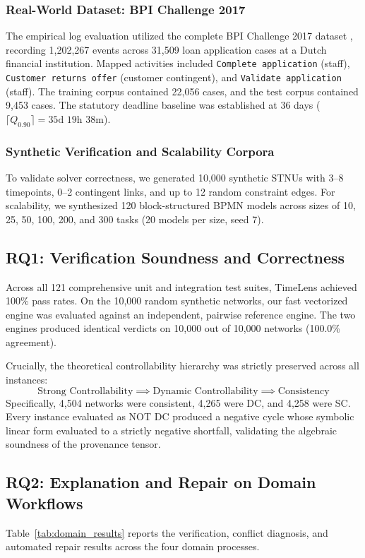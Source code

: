 \documentclass[conference]{IEEEtran}
\begin{document}
\subsubsection{Real-World Dataset: BPI Challenge 2017}
The empirical log evaluation utilized the complete BPI Challenge 2017 dataset \cite{bpi2017}, recording 1,202,267 events across 31,509 loan application cases at a Dutch financial institution. Mapped activities included \texttt{Complete application} (staff), \texttt{Customer returns offer} (customer contingent), and \texttt{Validate application} (staff). The training corpus contained 22,056 cases, and the test corpus contained 9,453 cases. The statutory deadline baseline was established at 36 days ($\lceil Q_{0.90} \rceil = 35\text{d } 19\text{h } 38\text{m}$).

\subsubsection{Synthetic Verification and Scalability Corpora}
To validate solver correctness, we generated 10,000 synthetic STNUs with 3--8 timepoints, 0--2 contingent links, and up to 12 random constraint edges. For scalability, we synthesized 120 block-structured BPMN models across sizes of 10, 25, 50, 100, 200, and 300 tasks (20 models per size, seed 7).

\subsection{RQ1: Verification Soundness and Correctness}
Across all 121 comprehensive unit and integration test suites, TimeLens achieved 100\% pass rates. On the 10,000 random synthetic networks, our fast vectorized engine was evaluated against an independent, pairwise reference engine. The two engines produced identical verdicts on 10,000 out of 10,000 networks (100.0\% agreement). 

Crucially, the theoretical controllability hierarchy was strictly preserved across all instances:
\begin{equation}
\text{Strong Controllability} \implies \text{Dynamic Controllability} \implies \text{Consistency}
\end{equation}
Specifically, 4,504 networks were consistent, 4,265 were DC, and 4,258 were SC. Every instance evaluated as NOT DC produced a negative cycle whose symbolic linear form evaluated to a strictly negative shortfall, validating the algebraic soundness of the provenance tensor.

\subsection{RQ2: Explanation and Repair on Domain Workflows}
Table~\ref{tab:domain_results} reports the verification, conflict diagnosis, and automated repair results across the four domain processes.
\end{document}
